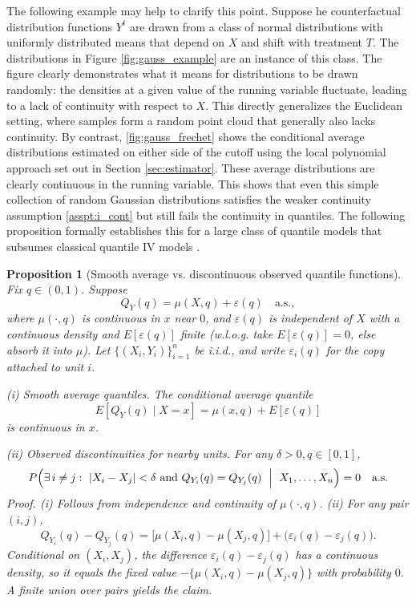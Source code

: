 \documentclass[12pt]{article}
\newtheorem{proposition}{Proposition}
\begin{document}
The following example may help to clarify this point. Suppose he counterfactual distribution functions $Y^t$ are drawn from a class of normal distributions with uniformly distributed means that depend on $X$ and shift with treatment $T$. The distributions in Figure \ref{fig:gauss_example} are an instance of this class. The figure clearly demonstrates what it means for distributions to be drawn randomly: the densities at a given value of the running variable fluctuate, leading to a lack of continuity with respect to $X$. This directly generalizes the Euclidean setting, where samples form a random point cloud that generally also lacks continuity. By contrast, \ref{fig:gauss_frechet} shows the conditional average distributions estimated on either side of the cutoff using the local polynomial approach set out in Section \ref{sec:estimator}. These average distributions are clearly continuous in the running variable. This shows that even this simple collection of random Gaussian distributions satisfies the weaker continuity assumption \ref{asspt:i_cont} but still fails the continuity in quantiles. The following proposition formally establishes this for a large class of quantile models that subsumes classical quantile IV models \citep{chernozhukov2005iv}.  
\begin{proposition}[Smooth average vs. discontinuous observed quantile functions]\label{prop:gen-smooth-jagged}
Fix $q\in(0,1)$. Suppose
\begin{equation} \label{eq:separable_quantile_model}
Q_Y(q)=\mu(X,q)+\varepsilon(q)\quad\text{a.s.},
\end{equation}
where $\mu(\cdot,q)$ is continuous in $x$ near $0$, and $\varepsilon(q)$ is independent of $X$ with a continuous density and $E[\varepsilon(q)]$ finite
(\emph{w.l.o.g.} take $E[\varepsilon(q)]=0$, else absorb it into $\mu$). Let $\{(X_i,Y_i)\}_{i=1}^n$ be i.i.d., and write $\varepsilon_i(q)$ for the copy attached to unit $i$.

\emph{(i) Smooth average quantiles.} The conditional average quantile
\[
E\left[Q_Y(q)\mid X=x\right]
=\mu(x,q)+E[\varepsilon(q)]
\]
is continuous in $x$.

\emph{(ii) Observed discontinuities for nearby units.} For any $\delta>0, q \in [0,1]$,
\[
P\!\left(\exists\,i\neq j:\ |X_i-X_j|<\delta\ \text{and}\ Q_{Y_i}(q)=Q_{Y_j}(q)\ \Bigm|\ X_1,\ldots,X_n\right)=0
\quad\text{a.s.}
\]
\emph{Proof.} (i) Follows from independence and continuity of $\mu(\cdot,q)$.
(ii) For any pair $(i,j)$,
\[
Q_{Y_i}(q)-Q_{Y_j}(q)
=\bigl[\mu(X_i,q)-\mu(X_j,q)\bigr]+\bigl(\varepsilon_i(q)-\varepsilon_j(q)\bigr).
\]
Conditional on $(X_i,X_j)$, the difference $\varepsilon_i(q)-\varepsilon_j(q)$ has a continuous density, so it equals the fixed value $-\{\mu(X_i,q)-\mu(X_j,q)\}$ with probability $0$. A finite union over pairs yields the claim. \qedsymbol
\end{proposition}
\end{document}
